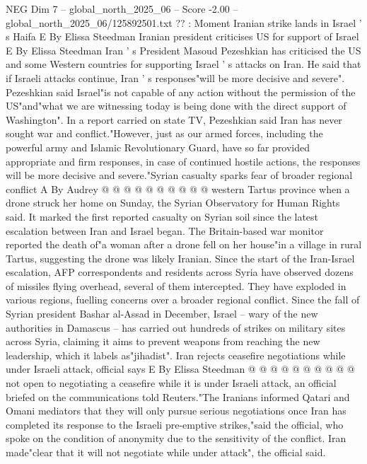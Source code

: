 \begin{textsample}{NEG Dim 7 – global\_north\_2025\_06 – Score -2.00 – global\_north\_2025\_06/125892501.txt}  \label{ex:f7_neg_076}
?? : Moment Iranian strike lands in Israel ' s Haifa E By Elissa Steedman Iranian president criticises US for support of Israel E By Elissa Steedman Iran ' s President Masoud Pezeshkian has criticised the US and some Western countries for supporting Israel ' s attacks on Iran.
He said that if Israeli attacks continue, Iran ' s responses"will be more decisive and severe".
Pezeshkian said Israel"is not capable of any action without the permission of the US"and"what we are witnessing today is being done with the direct support of Washington".
In a report carried on state TV, Pezeshkian said Iran has never sought war and conflict."However, just as our armed forces, including the powerful army and Islamic Revolutionary Guard, have so far provided appropriate and firm responses, in case of continued hostile actions, the responses will be more decisive and severe."Syrian casualty sparks fear of broader regional conflict A By Audrey @ @ @ @ @ @ @ @ @ @ western Tartus province when a drone struck her home on Sunday, the Syrian Observatory for Human Rights said.
It marked the first reported casualty on Syrian soil since the latest escalation between Iran and Israel began.
The Britain-based war monitor reported the death of"a woman after a drone fell on her house"in a village in rural Tartus, suggesting the drone was likely Iranian.
Since the start of the Iran-Israel escalation, AFP correspondents and residents across Syria have observed dozens of missiles flying overhead, several of them intercepted.
They have exploded in various regions, fuelling concerns over a broader regional conflict.
Since the fall of Syrian president Bashar al-Assad in December, Israel -- wary of the new authorities in Damascus -- has carried out hundreds of strikes on military sites across Syria, claiming it aims to prevent weapons from reaching the new leadership, which it labels as"jihadist".
Iran rejects ceasefire negotiations while under Israeli attack, official says E By Elissa Steedman @ @ @ @ @ @ @ @ @ @ not open to negotiating a ceasefire while it is under Israeli attack, an official briefed on the communications told Reuters."The Iranians informed Qatari and Omani mediators that they will only pursue serious negotiations once Iran has completed its response to the Israeli pre-emptive strikes,"said the official, who spoke on the condition of anonymity due to the sensitivity of the conflict.
Iran made"clear that it will not negotiate while under attack", the official said.

\end{textsample}
